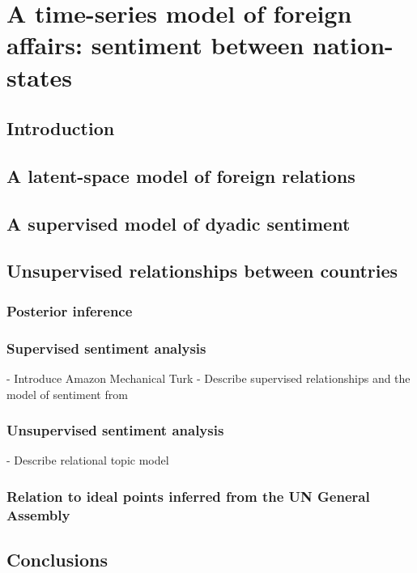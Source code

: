 \chapter{A time-series model of foreign affairs: sentiment between nation-states}
\label{chapter:foreign_relations}

\section*{Introduction}



%

\section{A latent-space model of foreign relations}


\section{A supervised model of dyadic sentiment}


\section{Unsupervised relationships between countries}


\subsection{Posterior inference}

\subsection{Supervised sentiment analysis}

  - Introduce Amazon Mechanical Turk
  - Describe supervised relationships and the model of sentiment from 

\subsection{Unsupervised sentiment analysis}

 - Describe relational topic model

\subsection{Relation to ideal points inferred from the UN General Assembly}

\section*{Conclusions}
